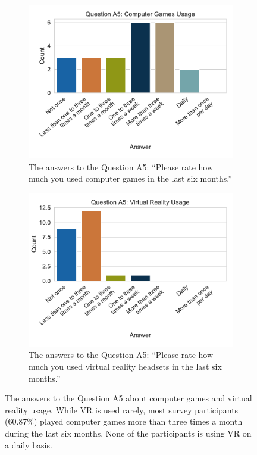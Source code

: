 \begin{figure}[H]
	\centering
	\begin{subfigure}[t]{.48\linewidth}%
		\centering
		\includegraphics[width=\linewidth]{figures/evaluation/res_demo_q8_s3.pdf}
		\caption{The answers to the Question A5: \enquote{Please rate how much you used computer games in the last six months.}}\label{fig:res-demo-q8-s3}
	\end{subfigure}%
	\hspace{0.03\linewidth}
	\begin{subfigure}[t]{.48\linewidth}%
		\centering
		\includegraphics[width=\linewidth]{figures/evaluation/res_demo_q8_s4.pdf}
		\caption{The answers to the Question A5: \enquote{Please rate how much you used virtual reality headsets in the last six months.}}\label{fig:res-demo-q8-s4}
	\end{subfigure}%
	\caption[Computer games and VR usage]{The answers to the Question A5 about computer games and virtual reality usage. While \gls{VR} is used rarely, most survey participants (60.87\%) played computer games more than three times a month during the last six months. None of the participants is using \gls{VR} on a daily basis.}\label{fig:res-demo-q8}
\end{figure}

